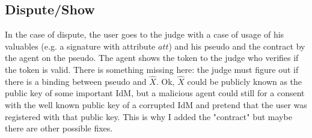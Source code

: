 \subsection{Dispute/Show}
In the case of dispute, the user goes to the judge with a case of usage of his valuables (e.g. a signature with attribute $att$) and his \textsf{pseudo} and the contract by the agent on the \textsf{pseudo}. The agent shows the token to the judge who verifies if the token is valid.
There is something missing here: the judge must figure out if there is a binding between pseudo and $\hat{X}$. Ok, $\hat{X}$ could be publicly known as the public key of some important IdM, but a malicious agent could still for a consent with the well known public key of a corrupted IdM and pretend that the user was registered with that public key. This is why I added the "contract" but maybe there are other possible fixes.




